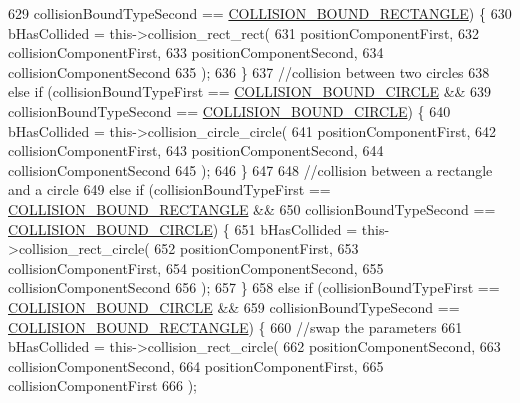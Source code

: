 \begin{DoxyCode}
629                 collisionBoundTypeSecond == \hyperlink{_a_e___attributes_8h_a3a31a6297a55375fdc090f881de08327}{COLLISION\_BOUND\_RECTANGLE}) \{
630                 bHasCollided = this->collision\_rect\_rect(
631                     positionComponentFirst,
632                     collisionComponentFirst,
633                     positionComponentSecond,
634                     collisionComponentSecond
635                     );
636             \}
637             \textcolor{comment}{//collision between two circles}
638             \textcolor{keywordflow}{else} \textcolor{keywordflow}{if} (collisionBoundTypeFirst == \hyperlink{_a_e___attributes_8h_a50b28a4aee049371f130f3eafa9c942f}{COLLISION\_BOUND\_CIRCLE} &&
639                 collisionBoundTypeSecond == \hyperlink{_a_e___attributes_8h_a50b28a4aee049371f130f3eafa9c942f}{COLLISION\_BOUND\_CIRCLE}) \{
640                 bHasCollided = this->collision\_circle\_circle(
641                     positionComponentFirst,
642                     collisionComponentFirst,
643                     positionComponentSecond,
644                     collisionComponentSecond
645                     );
646             \}
647 
648             \textcolor{comment}{//collision between a rectangle and a circle}
649             \textcolor{keywordflow}{else} \textcolor{keywordflow}{if} (collisionBoundTypeFirst == \hyperlink{_a_e___attributes_8h_a3a31a6297a55375fdc090f881de08327}{COLLISION\_BOUND\_RECTANGLE} &&
650                 collisionBoundTypeSecond == \hyperlink{_a_e___attributes_8h_a50b28a4aee049371f130f3eafa9c942f}{COLLISION\_BOUND\_CIRCLE}) \{
651                 bHasCollided = this->collision\_rect\_circle(
652                     positionComponentFirst,
653                     collisionComponentFirst,
654                     positionComponentSecond,
655                     collisionComponentSecond
656                     );
657             \}
658             \textcolor{keywordflow}{else} \textcolor{keywordflow}{if} (collisionBoundTypeFirst == \hyperlink{_a_e___attributes_8h_a50b28a4aee049371f130f3eafa9c942f}{COLLISION\_BOUND\_CIRCLE} &&
659                 collisionBoundTypeSecond == \hyperlink{_a_e___attributes_8h_a3a31a6297a55375fdc090f881de08327}{COLLISION\_BOUND\_RECTANGLE}) \{
660                 \textcolor{comment}{//swap the parameters}
661                 bHasCollided = this->collision\_rect\_circle(
662                     positionComponentSecond,
663                     collisionComponentSecond,
664                     positionComponentFirst,
665                     collisionComponentFirst
666                     );

\end{DoxyCode}
